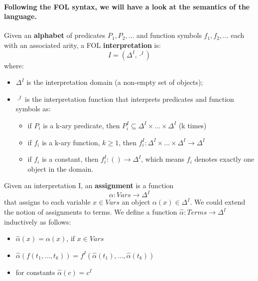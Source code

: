 \paragraph*{\textnormal{Following the FOL syntax, we will have a look at the semantics of the language.}}
\begin{defs}
	Given an \textbf{alphabet} of predicates $P_{1},P_{2},\dots$ and function symbols $f_{1},f_{2},\ldots$ each with an associated arity, a FOL \textbf{interpretation} is:
	\begin{equation*}
		I = (\Delta^{I},\cdot^{I})
	\end{equation*}
where:
\begin{itemize}
	\item $\Delta^{I}$ is the interpretation domain (a non-empty set of objects);
	\item $\cdot^{I}$ is the interpretation function that interprets predicates and function symbols as:
	\begin{itemize}
		\item if $P_{i}$ is a k-ary predicate, then $P_{i}^{I} \subseteq \Delta^{I} \times \ldots \times \Delta^{I}$ (k times)
		\item if $f_{i}$ is a k-ary function, $k \geq 1$, then $f_{i}^{I} : \Delta^{I} \times \ldots \times \Delta^{I} \rightarrow \Delta^{I}$
		\item if $f_{i}$ is a constant, then $f_{i}^{I} : () \rightarrow \Delta^{I}$, which means $f_{i}$ denotes exactly one object in the domain.
	\end{itemize} 
\end{itemize}
\end{defs}

\begin{defs}
	Given an interpretation I, an \textbf{assignment} is a function
	\begin{equation*}
		\alpha : Vars \rightarrow \Delta^{I}
	\end{equation*}
that assigns to each variable $x \in Vars$ an object $\alpha(x) \in \Delta^{I}$. We could extend the notion of assignments to terms. We define a function $\hat{\alpha} : Terms \rightarrow \Delta^{I}$ inductively as follows:
\begin{itemize}
	\item $\hat{\alpha}(x) = \alpha (x)$, if $x \in Vars$
	\item $\hat{\alpha}(f(t_{1},\ldots,t_{k})) = f^{I}(\hat{\alpha}(t_{1}),\ldots,\hat{\alpha}(t_{k}))$
	\item for constants $\hat{\alpha}(c) = c^{I}$
\end{itemize}
\end{defs}

